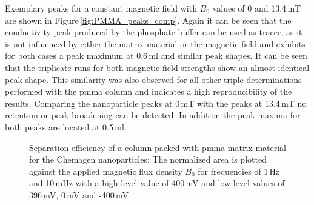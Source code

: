 Exemplary peaks for a constant magnetic field with $B_{0}$ values of 0 and 13.4\,mT are shown in Figure\,\ref{fig:PMMA_peaks_comp}. Again it can be seen that the conductivity peak produced by the phosphate buffer can be used as tracer, as it is not influenced by either the matrix material or the magnetic field and exhibits for both cases a peak maximum at 0.6\,ml and similar peak shapes. It can be seen that the triplicate runs for both magnetic field strengths show an almost identical peak shape. This similarity was also observed for all other triple determinations performed with the \gls{pmma} column and indicates a high reproducibility of the results. Comparing the nanoparticle peaks at 0\,mT with the peaks at 13.4\,mT no retention or peak broadening can be detected. In addition the peak maxima for both peaks are located at 0.5\,ml. 
 \FloatBarrier

\begin{figure}
\centering
{}
\caption[Separation efficiency of a column packed with \gls{pmma} matrix material]{Separation efficiency of a column packed with \gls{pmma} matrix material for the Chemagen nanoparticles: The normalized area is plotted against the applied magnetic flux density $B_{0}$ for frequencies of 1\,Hz and 10\,mHz with a high-level value of 400\,mV and low-level values of 396\,mV, 0\,mV and -400\,mV
\label{fig:norm_area_PMMA}
}
\end{figure}

